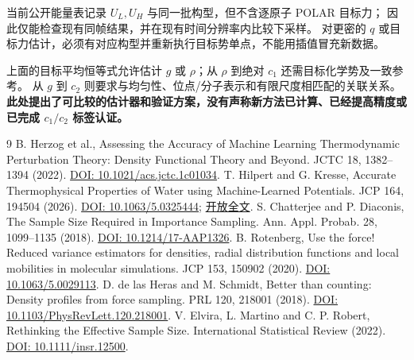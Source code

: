 \documentclass[11pt,a4paper]{article}
\begin{document}
当前公开能量表记录 $U_L,U_H$ 与同一批构型，但不含逐原子 POLAR 目标力；
因此仅能检查现有同帧结果，并在现有时间分辨率内比较下采样。
对更密的 $q$ 或目标力估计，必须有对应构型并重新执行目标势单点，不能用插值冒充新数据。

上面的目标平均恒等式允许估计 $g$ 或 $\rho$；从 $\rho$ 到绝对 $c_1$ 还需目标化学势及一致参考。
从 $g$ 到 $c_2$ 则要求与均匀性、位点/分子表示和有限尺度相匹配的关联关系。
\textbf{此处提出了可比较的估计器和验证方案，没有声称新方法已计算、已经提高精度或已完成 $c_1/c_2$ 标签认证。}

\newpage
\begin{thebibliography}{9}
 B. Herzog et al., Assessing the Accuracy of Machine Learning Thermodynamic Perturbation Theory: Density Functional Theory and Beyond. JCTC 18, 1382--1394 (2022). \href{https://doi.org/10.1021/acs.jctc.1c01034}{DOI: 10.1021/acs.jctc.1c01034}.
 T. Hilpert and G. Kresse, Accurate Thermophysical Properties of Water using Machine-Learned Potentials. JCP 164, 194504 (2026). \href{https://doi.org/10.1063/5.0325444}{DOI: 10.1063/5.0325444}; \href{https://arxiv.org/html/2601.21103v1}{开放全文}.
 S. Chatterjee and P. Diaconis, The Sample Size Required in Importance Sampling. Ann. Appl. Probab. 28, 1099--1135 (2018). \href{https://doi.org/10.1214/17-AAP1326}{DOI: 10.1214/17-AAP1326}.
 B. Rotenberg, Use the force! Reduced variance estimators for densities, radial distribution functions and local mobilities in molecular simulations. JCP 153, 150902 (2020). \href{https://doi.org/10.1063/5.0029113}{DOI: 10.1063/5.0029113}.
 D. de las Heras and M. Schmidt, Better than counting: Density profiles from force sampling. PRL 120, 218001 (2018). \href{https://doi.org/10.1103/PhysRevLett.120.218001}{DOI: 10.1103/PhysRevLett.120.218001}.
 V. Elvira, L. Martino and C. P. Robert, Rethinking the Effective Sample Size. International Statistical Review (2022). \href{https://doi.org/10.1111/insr.12500}{DOI: 10.1111/insr.12500}.
\end{thebibliography}
\end{document}
